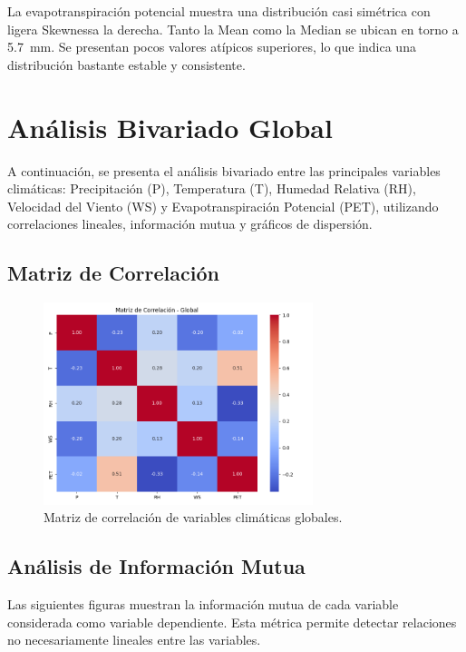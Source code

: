 La evapotranspiración potencial muestra una distribución casi simétrica con ligera Skewnessa la derecha. Tanto la Mean como la Median se ubican en torno a \SI{5.7}{\milli\meter}. Se presentan pocos valores atípicos superiores, lo que indica una distribución bastante estable y consistente.

\section{Análisis Bivariado Global}

A continuación, se presenta el análisis bivariado entre las principales variables climáticas: Precipitación (P), Temperatura (T), Humedad Relativa (RH), Velocidad del Viento (WS) y Evapotranspiración Potencial (PET), utilizando correlaciones lineales, información mutua y gráficos de dispersión.

\subsection{Matriz de Correlación}

\begin{figure}[H]
    \centering
    \includegraphics[width=0.7\textwidth]{resultados/global/bivariado/matriz_correlacion.png}
    \caption{Matriz de correlación de variables climáticas globales.}
    \label{fig:matriz_correlacion}
\end{figure}


\subsection{Análisis de Información Mutua}

Las siguientes figuras muestran la información mutua de cada variable considerada como variable dependiente. Esta métrica permite detectar relaciones no necesariamente lineales entre las variables.

